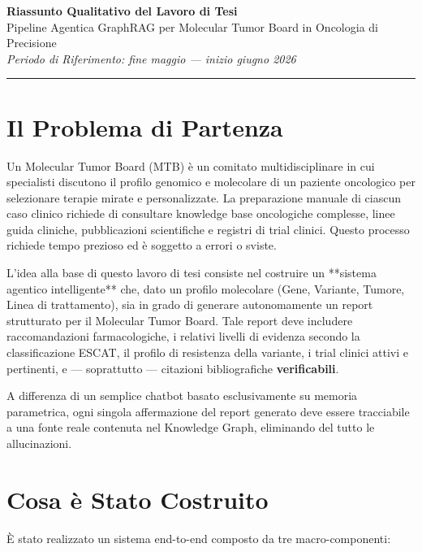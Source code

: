 \documentclass[12pt, a4paper]{article}
\newcommand{\pass}[1]{{\color{passgreen}\textbf{#1}}}
\begin{document}
\begin{center}
  {\LARGE\bfseries\color{primaryblue} Riassunto Qualitativo del Lavoro di Tesi}\\[0.4em]
  {\large\color{accentblue} Pipeline Agentica GraphRAG per Molecular Tumor Board in Oncologia di Precisione}\\[0.2em]
  {\small\color{medgray}\textit{Periodo di Riferimento: fine maggio --- inizio giugno 2026}}
\end{center}
\vspace{0.5em}\hrule\vspace{1.2em}

\section{Il Problema di Partenza}
Un Molecular Tumor Board (MTB) è un comitato multidisciplinare in cui specialisti discutono il profilo genomico e molecolare di un paziente oncologico per selezionare terapie mirate e personalizzate. La preparazione manuale di ciascun caso clinico richiede di consultare knowledge base oncologiche complesse, linee guida cliniche, pubblicazioni scientifiche e registri di trial clinici. Questo processo richiede tempo prezioso ed è soggetto a errori o sviste.

L'idea alla base di questo lavoro di tesi consiste nel costruire un **sistema agentico intelligente** che, dato un profilo molecolare (Gene, Variante, Tumore, Linea di trattamento), sia in grado di generare autonomamente un report strutturato per il Molecular Tumor Board. Tale report deve includere raccomandazioni farmacologiche, i relativi livelli di evidenza secondo la classificazione ESCAT, il profilo di resistenza della variante, i trial clinici attivi e pertinenti, e --- soprattutto --- citazioni bibliografiche \pass{verificabili}.

A differenza di un semplice chatbot basato esclusivamente su memoria parametrica, ogni singola affermazione del report generato deve essere tracciabile a una fonte reale contenuta nel Knowledge Graph, eliminando del tutto le allucinazioni.

\section{Cosa è Stato Costruito}
È stato realizzato un sistema end-to-end composto da tre macro-componenti:
\end{document}

